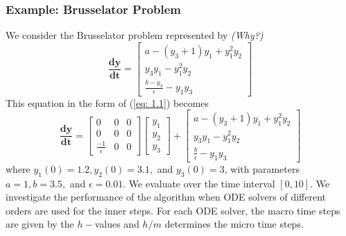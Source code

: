 \documentclass[12pt]{article}
\begin{document}
\subsubsection{Example: Brusselator Problem}
We consider the Brusselator problem represented by  \emph{(Why?)}
\begin{equation}
\mathbf{\frac{dy}{dt}} = \begin{bmatrix}
a - (y_3 + 1)y_1 + y_1^2y_2\\ y_3y_1 - y_1^2y_2\\ \frac{b-y_3}{\epsilon} - y_1y_3
\end{bmatrix}
\end{equation}
This equation in the form of (\ref{eq: 1.1}) becomes
\begin{equation}
\mathbf{\frac{dy}{dt}} = \begin{bmatrix}
0 & 0 & 0 \\ 0 & 0 & 0 \\ \frac{-1}{\epsilon} & 0 & 0
\end{bmatrix} \begin{bmatrix}
y_1 \\ y_2 \\ y_3
\end{bmatrix}  + \begin{bmatrix}
a - (y_3 + 1)y_1 + y_1^2y_2\\ y_3y_1 - y_1^2y_2\\ \frac{b}{\epsilon} - y_1y_3
\end{bmatrix}
\end{equation}
where $y_1(0) = 1.2, y_2(0) = 3.1,$ and $y_3(0) = 3$, with parameters $a=1, b=3.5,$ and $\epsilon =0.01$.  We evaluate over the time interval $[0,10]$. We investigate the performance of the algorithm when ODE solvers of different orders are used for the inner steps. For each ODE solver, the macro time steps are given by the $h-$values and $h/m$ determines the micro time steps.\\
\end{document}
